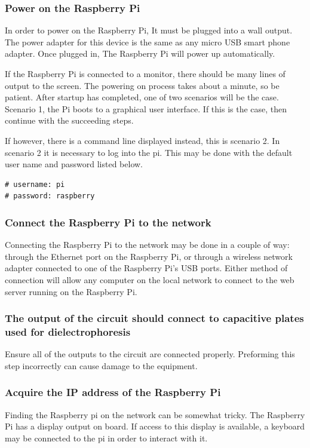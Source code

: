 \documentclass{article}	%
\begin{document}
\begin{multicols}{2}
\subsubsection{Power on the Raspberry Pi}
In order to power on the Raspberry Pi,
It must be plugged into a wall output.
The power adapter for this device is
the same as any micro USB smart phone adapter.
Once plugged in,
The Raspberry Pi will power up automatically.

If the Raspberry Pi is connected to a monitor,
there should be many lines of output to the screen.
The powering on process takes about a minute,
so be patient.
After startup has completed,
one of two scenarios will be the case.
Scenario 1, the Pi boots to a graphical
user interface.
If this is the case,
then continue with the succeeding steps.

If however, there is a command line displayed instead,
this is scenario 2.
In scenario 2 it is necessary to log into the pi.
This may be done with the default user name and password listed below.
\begin{lstlisting}
# username: pi
# password: raspberry
\end{lstlisting}

\subsubsection{Connect the Raspberry Pi to the network}
Connecting the Raspberry Pi to the network may
be done in a couple of way:
through the Ethernet port on the Raspberry Pi, or
through a wireless network adapter connected to
one of the Raspberry Pi's USB ports.
Either method of connection will allow
any computer on the local network to 
connect to the web server running on the Raspberry Pi.

\subsubsection{The output of the circuit should connect to capacitive plates used for dielectrophoresis}
Ensure all of the outputs to the circuit are connected properly.
Preforming this step incorrectly can cause damage to the equipment.

\subsubsection{Acquire the IP address of the Raspberry Pi}
Finding the Raspberry pi on the network can be somewhat tricky.
The Raspberry Pi has a display output on board.
If access to this display is available,
a keyboard may be connected to the pi in order to
interact with it.


\end{multicols}
\end{document}
